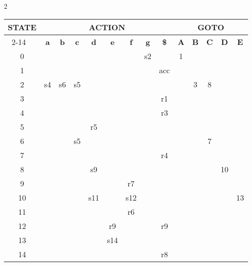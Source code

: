 \documentclass[twoside]{article}
\begin{document}
\begin{multicols}{2}
    \begin{table*}[b]
        \centering
        \begin{tabular}{|c|cccccccc|ccccc|}
            \hline
            \multirow{2}{*}{STATE} & \multicolumn{8}{|c|}{ACTION} & \multicolumn{5}{|c|}{GOTO} \\ \cline{2-14}
            ~ & \textbf{a} & \textbf{b} & \textbf{c} & \textbf{d} & \textbf{e} & \textbf{f} & \textbf{g} & \textbf{\$} & \textbf{A} & \textbf{B} & \textbf{C} & \textbf{D} & \textbf{E} \\ \hline
            0  & ~  & ~   & ~   & ~   & ~   & ~   & s2 & ~   & 1  & ~  & ~  & ~   & ~   \\ \hline
            1  & ~  & ~   & ~   & ~   & ~   & ~   & ~  & acc & ~  & ~  & ~  & ~   & ~   \\ \hline
            2  & s4 & s6  & s5  & ~   & ~   & ~   & ~  & ~   & ~  & 3  & 8  & ~   & ~   \\ \hline
            3  & ~  & ~   & ~   & ~   & ~   & ~   & ~  & r1  & ~  & ~  & ~  & ~   & ~   \\ \hline
            4  & ~  & ~   & ~   & ~   & ~   & ~   & ~  & r3  & ~  & ~  & ~  & ~   & ~   \\ \hline
            5  & ~  & ~   & ~   & r5  & ~   & ~   & ~  & ~   & ~  & ~  & ~  & ~   & ~   \\ \hline
            6  & ~  & ~   & s5  & ~   & ~   & ~   & ~  & ~   & ~  & ~  & 7  & ~   & ~   \\ \hline
            7  & ~  & ~   & ~   & ~   & ~   & ~   & ~  & r4  & ~  & ~  & ~  & ~   & ~   \\ \hline
            8  & ~  & ~   & ~   & s9  & ~   & ~   & ~  & ~   & ~  & ~  & ~  & 10  & ~   \\ \hline
            9  & ~  & ~   & ~   & ~   & ~   & r7  & ~  & ~   & ~  & ~  & ~  & ~   & ~   \\ \hline
            10 & ~  & ~   & ~   & s11 & ~   & s12 & ~  & ~   & ~  & ~  & ~  & ~   & 13  \\ \hline
            11 & ~  & ~   & ~   & ~   & ~   & r6  & ~  & ~   & ~  & ~  & ~  & ~   & ~   \\ \hline
            12 & ~  & ~   & ~   & ~   & r9  & ~   & ~  & r9  & ~  & ~  & ~  & ~   & ~   \\ \hline
            13 & ~  & ~   & ~   & ~   & s14 & ~   & ~  & ~   & ~  & ~  & ~  & ~   & ~   \\ \hline
            14 & ~  & ~   & ~   & ~   & ~   & ~   & ~  & r8  & ~  & ~  & ~  & ~   & ~   \\ \hline
        \end{tabular}
        \caption{SLR parse table for the grammar in problem 2} \label{tab:prob2parsetable}
    \end{table*}


\end{multicols}
\end{document}
